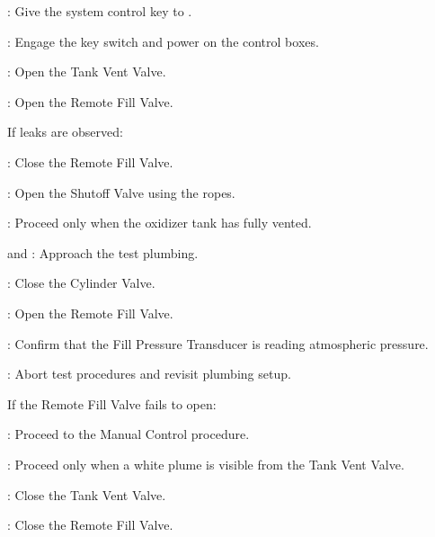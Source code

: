 \begin{checklist}
\begin{checklist}
        \item \daq{}
        \item \primary{}
        \item \secondary
    \end{checklist}
    \item \secondary: Give the system control key to \primary{}.
    \item \primary{}: Engage the key switch and power on the control boxes.
    \item \primary{}: Open the Tank Vent Valve.
    \item \primary{}: Open the Remote Fill Valve.
    \begin{checklist}[label=$\bullet$]
        \item If leaks are observed:
        \begin{checklist}
            \item \primary{}: Close the Remote Fill Valve.
            \item \primary{}: Open the Shutoff Valve using the ropes.
            \item \secondary: Proceed only when the oxidizer tank has fully vented.
            \item \primary{} and \secondary: Approach the test plumbing.
            \item \primary{}: Close the Cylinder Valve.
            \item \primary{}: Open the Remote Fill Valve.
            \item \daq{}: Confirm that the Fill Pressure Transducer is reading atmospheric pressure.
            \item \ops{}: Abort test procedures and revisit plumbing setup.
        \end{checklist}
        \item If the Remote Fill Valve fails to open:
        \begin{checklist}
            \item \ops{}: Proceed to the Manual Control procedure.
        \end{checklist}
    \end{checklist}
    \item \secondary{}: Proceed only when a white plume is visible from the Tank Vent Valve.
    \item \primary{}: Close the Tank Vent Valve.
    \item \primary{}: Close the Remote Fill Valve.
    \begin{checklist}[label=$\bullet$]

\end{checklist}
\end{checklist}
